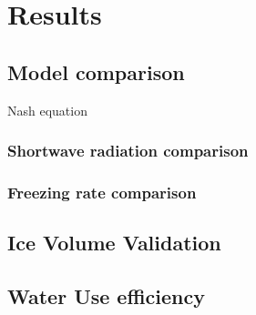 \documentclass[tc, manuscript]{copernicus}
\begin{document}



\section{Results}
\subsection{Model comparison}
Nash equation

\subsubsection{Shortwave radiation comparison}

\subsubsection{Freezing rate comparison}

\subsection{Ice Volume Validation}



\subsection{Water Use efficiency}

\end{document}
